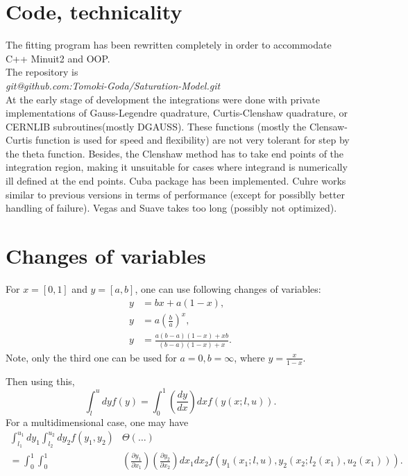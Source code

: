 \documentclass[12pt]{article}
\begin{document}
\section{Code, technicality}
The fitting program has been rewritten completely in order to accommodate C++  Minuit2 and OOP. \\
The repository is \\
\textit{ git@github.com:Tomoki-Goda/Saturation-Model.git }\\
At the early stage of development the integrations were done with private implementations of Gauss-Legendre quadrature, Curtis-Clenshaw quadrature, or CERNLIB subroutines(mostly DGAUSS). 
These functions (mostly the Clensaw-Curtis function is used for speed and flexibility) are not very tolerant for step by the theta function. Besides, the Clenshaw method has to take end points of the integration region, making it unsuitable for cases where integrand is numerically ill defined at the end points.
Cuba package has been implemented. Cuhre works similar to previous versions in terms of performance (except for possiblly better handling of failure). Vegas and Suave takes too long (possibly not optimized). 

\section{Changes of variables}
For $x=[0,1]$ and $y=[a,b]$, one can use following changes of variables:
\begin{align}
y&=b x+a(1-x), \\
y&=a\left(\frac{b}{a}\right)^x,\\
y&=\frac{a(b-a)(1-x)+x b}{(b-a)(1-x)+x}.
\end{align}
Note, only the third one can be used for $a=0, b=\infty$, where $y=\frac{x}{1-x}$.

Then using this, 
\begin{equation}
\int^u_l dy f(y)=\int^1_0 \left(\frac{dy}{dx}\right) dx f(y(x;l,u)).
\end{equation}
For a multidimensional case, one may have
\begin{equation}
\begin{split}
\int^{u_1}_{l_1} dy_1\int^{u_2}_{l_2} dy_2 f(y_1,y_2)& \Theta(\dots)\\
=\int^1_0\int^1_0& \left(\frac{\partial y_1}{\partial x_1}\right) \left(\frac{\partial y_2}{\partial x_2}\right)dx_1 dx_2 f\left(y_1(x_1; l ,u ),y_2(x_2; l_2(x_1) ,u_2(x_1 ) )\right).
\end{split}
\end{equation}
\end{document}
